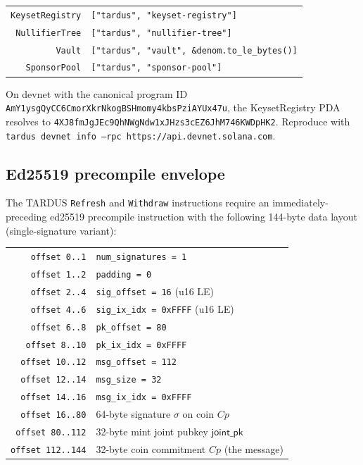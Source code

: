 \begin{center}\small
\begin{tabular}{rl}
\toprule
\texttt{KeysetRegistry}  & \texttt{["tardus", "keyset-registry"]}                       \\
\texttt{NullifierTree}   & \texttt{["tardus", "nullifier-tree"]}                        \\
\texttt{Vault}           & \texttt{["tardus", "vault", \&denom.to\_le\_bytes()]}          \\
\texttt{SponsorPool}     & \texttt{["tardus", "sponsor-pool"]}                          \\
\bottomrule
\end{tabular}
\end{center}

On devnet with the canonical program ID
\texttt{AmY1ysgQyCC6CmorXkrNkogBSHmomy4kbsPziAYUx47u}, the
KeysetRegistry PDA resolves to
\texttt{4XJ8fmJgJEc9QhNWgNdw1xJHzs3cEZ6JhM746KWDpHK2}.
Reproduce with
\texttt{tardus devnet info --rpc https://api.devnet.solana.com}.

\subsection{Ed25519 precompile envelope}
\label{sec:vec-ed25519-precompile}

The TARDUS \texttt{Refresh} and \texttt{Withdraw} instructions
require an immediately-preceding ed25519 precompile instruction
with the following 144-byte data layout (single-signature
variant):

\begin{center}\small
\begin{tabular}{rl}
\toprule
\texttt{offset 0..1}    & \texttt{num\_signatures = 1}      \\
\texttt{offset 1..2}    & \texttt{padding = 0}              \\
\texttt{offset 2..4}    & \texttt{sig\_offset = 16} (u16 LE) \\
\texttt{offset 4..6}    & \texttt{sig\_ix\_idx = 0xFFFF} (u16 LE) \\
\texttt{offset 6..8}    & \texttt{pk\_offset = 80}          \\
\texttt{offset 8..10}   & \texttt{pk\_ix\_idx = 0xFFFF}     \\
\texttt{offset 10..12}  & \texttt{msg\_offset = 112}        \\
\texttt{offset 12..14}  & \texttt{msg\_size = 32}           \\
\texttt{offset 14..16}  & \texttt{msg\_ix\_idx = 0xFFFF}    \\
\texttt{offset 16..80}  & 64-byte signature $\sigma$ on coin $Cp$ \\
\texttt{offset 80..112} & 32-byte mint joint pubkey $\mathsf{joint\_pk}$ \\
\texttt{offset 112..144} & 32-byte coin commitment $Cp$ (the message) \\
\bottomrule
\end{tabular}
\end{center}

